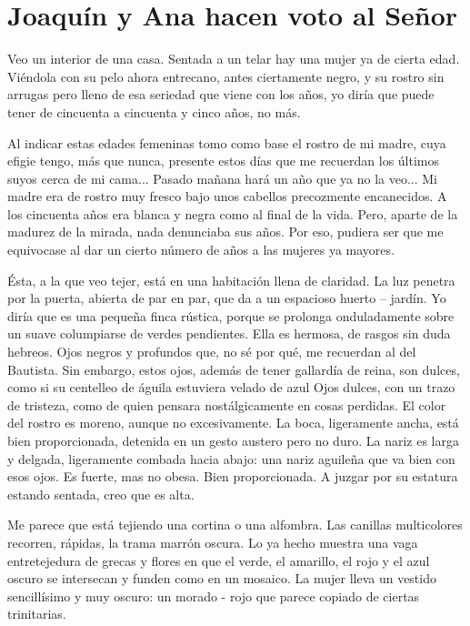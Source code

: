 \documentclass[12pt]{book} %
\begin{document}
\chapter*{Joaquín y Ana hacen voto al Señor}

Veo un interior de una casa. Sentada a un telar hay una mujer ya de cierta edad. Viéndola con su pelo ahora entrecano, antes ciertamente negro, y su rostro sin arrugas pero lleno de esa seriedad que viene con los años, yo diría que puede tener de cincuenta a cincuenta y cinco años, no más. 

 Al indicar estas edades femeninas tomo como base el rostro de mi madre, cuya efigie tengo, más que nunca, presente estos días que me recuerdan los últimos suyos cerca de mi cama... Pasado mañana hará un año que ya no la veo... Mi madre era de rostro muy fresco bajo unos cabellos precozmente encanecidos. A los cincuenta años era blanca y negra como al final de la vida. Pero, aparte de la madurez de la mirada, nada denunciaba sus años. Por eso, pudiera ser que me equivocase al dar un cierto número de años a las mujeres ya mayores. 

Ésta, a la que veo tejer, está en una habitación llena de claridad. La luz penetra por la puerta, abierta de par en par, que da a un espacioso huerto – jardín. Yo diría que es una pequeña finca rústica, porque se prolonga onduladamente sobre un suave columpiarse de verdes pendientes. Ella es hermosa, de rasgos sin duda hebreos. Ojos negros y profundos que, no sé por qué, me recuerdan al del Bautista. Sin embargo, estos ojos, además de tener gallardía de reina, son dulces, como si su centelleo de águila estuviera velado de azul Ojos dulces, con un trazo de tristeza, como de quien pensara nostálgicamente en cosas perdidas. El color del rostro es moreno, aunque no excesivamente. La boca, ligeramente ancha, está bien proporcionada, detenida en un gesto austero pero no duro. La nariz es larga y delgada, ligeramente combada hacia abajo: una nariz aguileña que va bien con esos ojos. Es fuerte, mas no obesa. Bien proporcionada. A juzgar por su estatura estando sentada, creo que es alta. 

Me parece que está tejiendo una cortina o una alfombra. Las canillas multicolores recorren, rápidas, la trama marrón oscura. Lo ya hecho muestra una vaga entretejedura de grecas y flores en que el verde, el amarillo, el rojo y el azul oscuro se intersecan y funden como en un mosaico. La mujer lleva un vestido sencillísimo y muy oscuro: un morado - rojo que parece copiado de ciertas trinitarias. 
\end{document}
